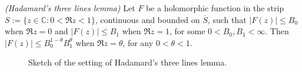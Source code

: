 \begin{mdframed}
	\begin{lemma}\emph{(Hadamard's three lines lemma)}
		Let $F$ be a holomorphic function in the strip $S := \{z \in \mathbb{C}: 0 < \Re z < 1\}$, continuous and bounded on $\overline{S}$, such that $\left| F(z)\right| \leqslant B_0$ when $\Re z = 0$ and $\left| F(z) \right| \leqslant B_1$ when $\Re z = 1$, for some $0 < B_0,B_1 < \infty$. Then $\left| F(z) \right| \leqslant B_0^{1 - \theta}B_1^\theta$ when $\Re z = \theta$, for any $0 < \theta < 1$.
	\end{lemma}
\end{mdframed}

\begin{figure}[h!tb]
	\centering
	\caption{Sketch of the setting of Hadamard's three lines lemma.}
	\label{fig:Hadamards_three_lines_lemma}
\end{figure}

